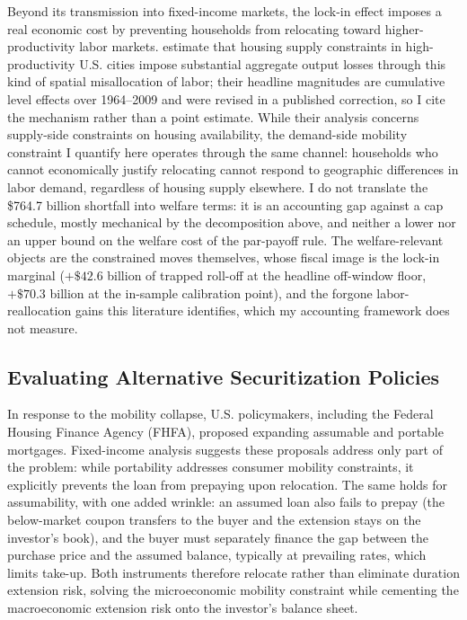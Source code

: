 \documentclass[12pt]{article}
\begin{document}
Beyond its transmission into fixed-income markets, the lock-in effect imposes a real economic cost by preventing households from relocating toward higher-productivity labor markets. \citet{hsieh2019} estimate that housing supply constraints in high-productivity U.S. cities impose substantial aggregate output losses through this kind of spatial misallocation of labor; their headline magnitudes are cumulative level effects over 1964--2009 and were revised in a published correction, so I cite the mechanism rather than a point estimate. While their analysis concerns supply-side constraints on housing availability, the demand-side mobility constraint I quantify here operates through the same channel: households who cannot economically justify relocating cannot respond to geographic differences in labor demand, regardless of housing supply elsewhere. I do not translate the \$764.7 billion shortfall into welfare terms: it is an accounting gap against a cap schedule, mostly mechanical by the decomposition above, and neither a lower nor an upper bound on the welfare cost of the par-payoff rule. The welfare-relevant objects are the constrained moves themselves, whose fiscal image is the lock-in marginal ($+\$42.6$ billion of trapped roll-off at the headline off-window floor, $+\$70.3$ billion at the in-sample calibration point), and the forgone labor-reallocation gains this literature identifies, which my accounting framework does not measure.

\subsection{Evaluating Alternative Securitization Policies}\label{sec:discussion-policy}

In response to the mobility collapse, U.S. policymakers, including the Federal Housing Finance Agency (FHFA), proposed expanding assumable and portable mortgages. Fixed-income analysis suggests these proposals address only part of the problem: while portability addresses consumer mobility constraints, it explicitly prevents the loan from prepaying upon relocation. The same holds for assumability, with one added wrinkle: an assumed loan also fails to prepay (the below-market coupon transfers to the buyer and the extension stays on the investor's book), and the buyer must separately finance the gap between the purchase price and the assumed balance, typically at prevailing rates, which limits take-up. Both instruments therefore relocate rather than eliminate duration extension risk, solving the microeconomic mobility constraint while cementing the macroeconomic extension risk onto the investor's balance sheet.
\end{document}

